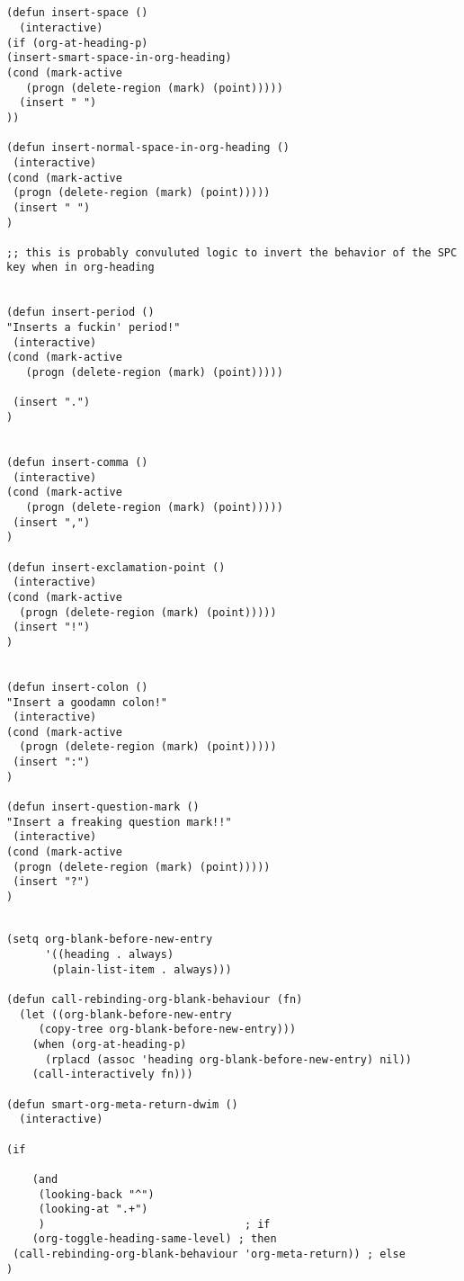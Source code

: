 \documentclass[11pt]{article}
\begin{document}
\label{sec:org8bc0a7d}
\begin{verbatim}


(defun insert-space ()
  (interactive) 
(if (org-at-heading-p)
(insert-smart-space-in-org-heading)
(cond (mark-active
   (progn (delete-region (mark) (point)))))
  (insert " ")
)) 

(defun insert-normal-space-in-org-heading ()
 (interactive)
(cond (mark-active
 (progn (delete-region (mark) (point))))) 
 (insert " ")
)

;; this is probably convuluted logic to invert the behavior of the SPC key when in org-heading


(defun insert-period ()
"Inserts a fuckin' period!"
 (interactive)
(cond (mark-active
   (progn (delete-region (mark) (point)))))

 (insert ".")
)


(defun insert-comma ()
 (interactive)
(cond (mark-active
   (progn (delete-region (mark) (point))))) 
 (insert ",")
)

(defun insert-exclamation-point ()
 (interactive)
(cond (mark-active
  (progn (delete-region (mark) (point)))))
 (insert "!")
)


(defun insert-colon ()
"Insert a goodamn colon!"
 (interactive)
(cond (mark-active
  (progn (delete-region (mark) (point))))) 
 (insert ":")
) 

(defun insert-question-mark ()
"Insert a freaking question mark!!"
 (interactive)
(cond (mark-active
 (progn (delete-region (mark) (point))))) 
 (insert "?")
) 


\end{verbatim}
\label{sec:org3ac2b06}
\begin{verbatim}
(setq org-blank-before-new-entry
      '((heading . always)
       (plain-list-item . always)))

(defun call-rebinding-org-blank-behaviour (fn)
  (let ((org-blank-before-new-entry
	 (copy-tree org-blank-before-new-entry)))
    (when (org-at-heading-p)
      (rplacd (assoc 'heading org-blank-before-new-entry) nil))
    (call-interactively fn)))

(defun smart-org-meta-return-dwim ()
  (interactive)

(if

    (and
     (looking-back "^")
     (looking-at ".+")
     )                               ; if
    (org-toggle-heading-same-level) ; then
 (call-rebinding-org-blank-behaviour 'org-meta-return)) ; else
)


\end{verbatim}
\end{document}
